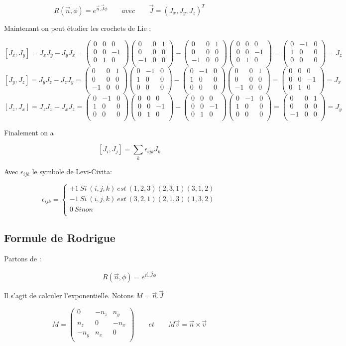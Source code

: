 \documentclass[12pt,a4paper]{article}
\newcommand{\Jx}
{
\begin{pmatrix}
	0&0&0\\
	0&0&-1\\
	0&1&0\\
\end{pmatrix}
}
\newcommand{\Jy}
{
	\begin{pmatrix}
		0&0&1\\
		0&0&0\\
		-1&0&0\\
	\end{pmatrix}
}
\newcommand{\Jz}
{
	\begin{pmatrix}
		0&-1&0\\
		1&0&0\\
		0&0&0\\
	\end{pmatrix}
}
\begin{document}
	\[
		\boxed{R(\vec{n},\phi) = e^{\vec{n}.\vec{J} \phi} \quad \quad avec\quad\quad \vec{J}=(J_x,J_y,J_z)^T }
	\]
	
	Maintenant on peut étudier les crochets de Lie :
	
	\[
		[J_x,J_y]=J_xJ_y-J_yJ_x=\Jx\Jy-\Jy\Jx=\Jz=J_z
	\]
	\[
		[J_y,J_z]=J_yJ_z-J_zJ_y=\Jy\Jz-\Jz\Jy=\Jx=J_x
	\]
	\[
		[J_z,J_x]=J_zJ_x-J_xJ_z=\Jz\Jx-\Jx\Jz=\Jy=J_y
	\]
	
	Finalement on a 
	
	\[
		\boxed{[J_i,J_j]=\sum_k \epsilon_{ijk}J_k}
	\]
	
	Avec $\epsilon_{ijk}$ le symbole de Levi-Civita:
	
	\[
		\epsilon_{ijk}=\left\{
		\begin{array}{l}
		+1\ Si\ (i,j,k)\ est \ (1,2,3)(2,3,1)(3,1,2)\\
		-1\ Si\ (i,j,k)\ est \ (3,2,1)(2,1,3)(1,3,2)\\
		0\ Sinon\\
		\end{array}
		\right.
	\]
	
	\subsection{Formule de Rodrigue}
	Partons de :
	
	\[
		R(\vec{n},\phi) = e^{\vec{n}.\vec{J} \phi}
	\]
	
	Il s'agit de calculer l'exponentielle. Notons $M=\vec{n}.\vec{J}$
	
	\[
		\boxed{M=\begin{pmatrix}
			0&-n_z&n_y\\
			n_z&0&-n_x\\
			-n_y&n_x&0\\
			\end{pmatrix}}
		\quad\quad et \quad\quad \boxed{M\vec{v}=\vec{n} \times \vec{v}}
	\]
	
\end{document}
